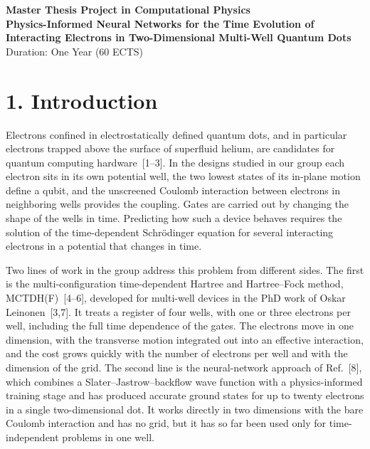 \documentclass[12pt,a4paper]{article}
\begin{document}
\begin{center}
    {\Large \textbf{Master Thesis Project in Computational Physics}}\\[0.3cm]
    {\large \textbf{Physics-Informed Neural Networks for the Time Evolution of Interacting Electrons in Two-Dimensional Multi-Well Quantum Dots}}\\[0.2cm]
    \vspace{0.3cm}
    {Duration: One Year (60 ECTS)}
\end{center}

\vspace{1cm}

\section*{1. Introduction}

Electrons confined in electrostatically defined quantum dots, and in
particular electrons trapped above the surface of superfluid helium,
are candidates for quantum computing hardware~[1--3].  In the designs
studied in our group each electron sits in its own potential well, the
two lowest states of its in-plane motion define a qubit, and the
unscreened Coulomb interaction between electrons in neighboring wells
provides the coupling.  Gates are carried out by changing the shape of
the wells in time.  Predicting how such a device behaves requires the
solution of the time-dependent Schr\"odinger equation for several
interacting electrons in a potential that changes in time.

Two lines of work in the group address this problem from different
sides.  The first is the multi-configuration time-dependent Hartree
and Hartree--Fock method, MCTDH(F)~[4--6], developed for multi-well
devices in the PhD work of Oskar Leinonen~[3,7].  It treats a register
of four wells, with one or three electrons per well, including the
full time dependence of the gates.  The electrons move in one
dimension, with the transverse motion integrated out into an effective
interaction, and the cost grows quickly with the number of electrons
per well and with the dimension of the grid.  The second line is the
neural-network approach of Ref.~[8], which combines a
Slater--Jastrow--backflow wave function with a physics-informed
training stage and has produced accurate ground states for up to
twenty electrons in a single two-dimensional dot.  It works directly
in two dimensions with the bare Coulomb interaction and has no grid,
but it has so far been used only for time-independent problems in one
well.
\end{document}
